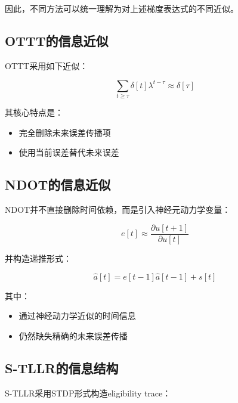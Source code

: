 \documentclass[journal,12pt,onecolumn]{IEEEtran}
\begin{document}
因此，不同方法可以统一理解为对上述梯度表达式的不同近似。



\subsection{OTTT的信息近似}

OTTT采用如下近似：

\begin{equation}
\sum_{t \ge \tau} \delta[t] \lambda^{t-\tau}
\approx
\delta[\tau]
\end{equation}



其核心特点是：

\begin{itemize}
\item 完全删除未来误差传播项
\item 使用当前误差替代未来误差
\end{itemize}




\subsection{NDOT的信息近似}

NDOT并不直接删除时间依赖，而是引入神经元动力学变量：

\begin{equation}
e[t] \approx \frac{\partial u[t+1]}{\partial u[t]}
\end{equation}

并构造递推形式：

\begin{equation}
\hat{a}[t] = e[t-1]\hat{a}[t-1] + s[t]
\end{equation}





其中：

\begin{itemize}
\item 通过神经动力学近似的时间信息
\item 仍然缺失精确的未来误差传播
\end{itemize}



\subsection{S-TLLR的信息结构}

S-TLLR采用STDP形式构造eligibility trace：
\end{document}

